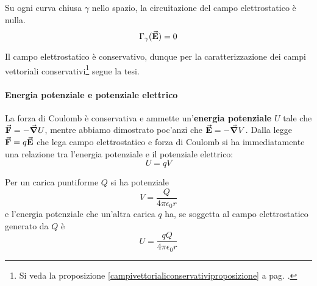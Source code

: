 \begin{corollary}
	Su ogni curva chiusa $\gamma$ nello spazio, la circuitazione del campo elettrostatico è nulla.
	\begin{equation}
		\Gamma_{\gamma}(\vb*{\va{E}})=0
	\end{equation}
\end{corollary}
\begin{demonstration}
	Il campo elettrostatico è conservativo, dunque per la caratterizzazione dei campi vettoriali conservativi\footnote{Si veda la proposizione \ref{campivettorialiconservativiproposizione} a pag. \pageref{campivettorialiconservativiproposizione}.} segue la tesi. 
\end{demonstration}%
\paragraph{Energia potenziale e potenziale elettrico}
La forza di Coulomb è conservativa e ammette un'\textbf{energia potenziale} $U$ tale che $\vb*{\va{F}}=-\grad{U}$, mentre abbiamo dimostrato poc'anzi che $\vb*{\va{E}}=-\grad{V}$. Dalla legge $\vb*{\va{F}}=q\vb*{\va{E}}$ che lega campo elettrostatico e forza di Coulomb si ha immediatamente una relazione tra l'energia potenziale e il potenziale elettrico:
\begin{equation}
	U=qV\label{EnergiaPotenziale}
\end{equation}
\begin{example}
	Per un carica puntiforme $Q$ si ha potenziale
	\begin{equation}
		V=\frac{Q}{4\pi\epsilon_0r}
	\end{equation}
	e l'energia potenziale che un'altra carica $q$ ha, se soggetta al campo elettrostatico generato da $Q$ è
	\begin{equation}
		U=\frac{qQ}{4\pi\epsilon_0r}
	\end{equation}
\end{example}
